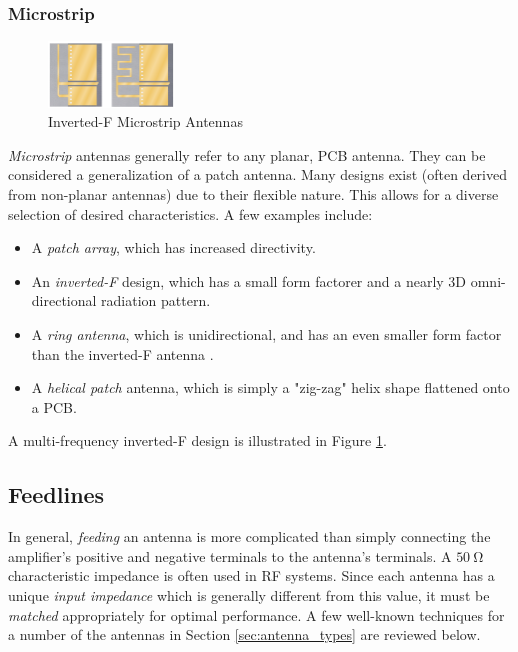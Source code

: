 \subsubsection{Microstrip}
\begin{figure}[!htb]
  \centering
  \includegraphics[width=0.3\textwidth]{invertedF}
  \caption{Inverted-F Microstrip Antennas \cite{site-invertedFAntenna}}
  \label{fig:invertedF}
\end{figure}
\textit{Microstrip} antennas generally refer to any planar, PCB antenna. They can be considered a generalization of a patch antenna. Many designs exist (often derived from non-planar antennas) due to their flexible nature. This allows for a diverse selection of desired characteristics. A few examples include:
\begin{itemize}
  \item A \textit{patch array}, which has increased directivity.
  \item An \textit{inverted-F} design, which has a small form factorer and a nearly 3D omni-directional radiation pattern.
  \item A \textit{ring antenna}, which is unidirectional, and has an even smaller form factor than the inverted-F antenna \cite{paper-lowProfileRingAntenna}.
  \item A \textit{helical patch} antenna, which is simply a "zig-zag" helix shape flattened onto a PCB.
\end{itemize}

\noindent A multi-frequency inverted-F design is illustrated in Figure \ref{fig:invertedF}.

\subsection{Feedlines}
In general, \textit{feeding} an antenna is more complicated than simply connecting the amplifier's positive and negative terminals to the antenna's terminals. A $\SI{50}{\ohm}$ characteristic impedance is often used in RF systems. Since each antenna has a unique \textit{input impedance} which is generally different from this value, it must be \textit{matched} appropriately for optimal performance. A few well-known techniques for a number of the antennas in Section \ref{sec:antenna_types} are reviewed below.

